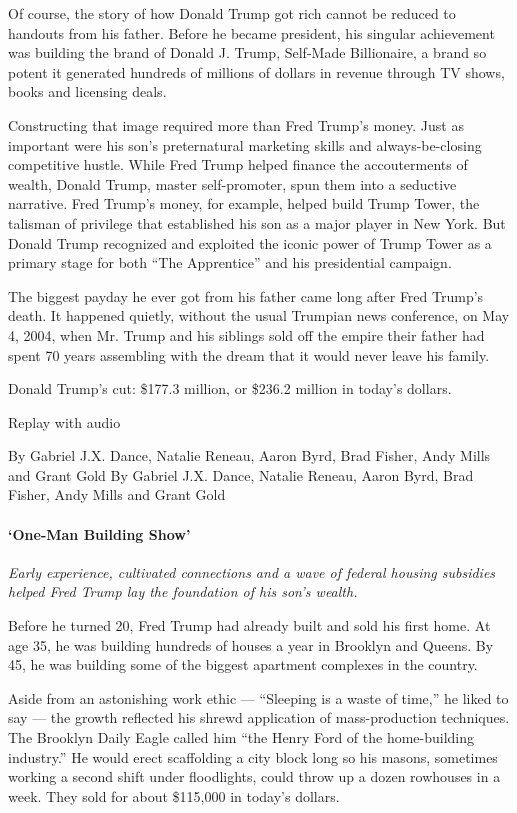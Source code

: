 Of course, the story of how Donald Trump got rich cannot be reduced to
handouts from his father. Before he became president, his singular
achievement was building the brand of Donald J. Trump, Self-Made
Billionaire, a brand so potent it generated hundreds of millions of
dollars in revenue through TV shows, books and licensing deals.

Constructing that image required more than Fred Trump's money. Just as
important were his son's preternatural marketing skills and
always-be-closing competitive hustle. While Fred Trump helped finance
the accouterments of wealth, Donald Trump, master self-promoter, spun
them into a seductive narrative. Fred Trump's money, for example, helped
build Trump Tower, the talisman of privilege that established his son as
a major player in New York. But Donald Trump recognized and exploited
the iconic power of Trump Tower as a primary stage for both ``The
Apprentice'' and his presidential campaign.

The biggest payday he ever got from his father came long after Fred
Trump's death. It happened quietly, without the usual Trumpian news
conference, on May 4, 2004, when Mr. Trump and his siblings sold off the
empire their father had spent 70 years assembling with the dream that it
would never leave his family.

Donald Trump's cut: \$177.3 million, or \$236.2 million in today's
dollars.

Replay with audio

By Gabriel J.X. Dance, Natalie Reneau, Aaron Byrd, Brad Fisher, Andy
Mills and Grant Gold By Gabriel J.X. Dance, Natalie Reneau, Aaron Byrd,
Brad Fisher, Andy Mills and Grant Gold

\hypertarget{one-man-building-show}{%
\paragraph{`One-Man Building Show'}\label{one-man-building-show}}

\emph{Early experience, cultivated connections and a wave of federal
housing subsidies helped Fred Trump lay the foundation of his son's
wealth.}

Before he turned 20, Fred Trump had already built and sold his first
home. At age 35, he was building hundreds of houses a year in Brooklyn
and Queens. By 45, he was building some of the biggest apartment
complexes in the country.

Aside from an astonishing work ethic --- ``Sleeping is a waste of
time,'' he liked to say --- the growth reflected his shrewd application
of mass-production techniques. The Brooklyn Daily Eagle called him ``the
Henry Ford of the home-building industry.'' He would erect scaffolding a
city block long so his masons, sometimes working a second shift under
floodlights, could throw up a dozen rowhouses in a week. They sold for
about \$115,000 in today's dollars.


